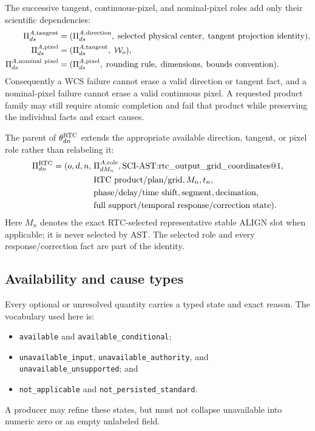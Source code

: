 The successive tangent, continuous-pixel, and nominal-pixel roles add only
their scientific dependencies:
\begin{align}
 \Pi^{A,{\rm tangent}}_{ds}
   &= (\Pi^{A,{\rm direction}}_{ds},\;
       \text{selected physical center},\;
       \text{tangent projection identity}),
       \label{eq:tangent-parent}\\
 \Pi^{A,{\rm pixel}}_{ds}
   &= (\Pi^{A,{\rm tangent}}_{ds},\;\mathcal W_o),
       \label{eq:pixel-parent}\\
 \Pi^{A,{\rm nominal\ pixel}}_{ds}
   &= (\Pi^{A,{\rm pixel}}_{ds},\;\text{rounding rule},\;
       \text{dimensions},\;\text{bounds convention}).
       \label{eq:nominal-pixel-parent}
\end{align}
Consequently a WCS failure cannot erase a valid direction or tangent fact,
and a nominal-pixel failure cannot erase a valid continuous pixel.  A
requested product family may still require atomic completion and fail that
product while preserving the individual facts and exact causes.

The parent of $\theta^{\rm RTC}_{dn}$ extends the appropriate available
direction, tangent, or pixel role rather than relabeling it:
\begin{equation}
 \begin{aligned}
 \Pi^{\rm RTC}_{dn} = (o,d,n,\;&\Pi^{A,{\rm role}}_{dM_n},
   \text{SCI-AST:rtc\_output\_grid\_coordinates@1},\\
   &\text{RTC product/plan/grid},M_n,t_n,\\
   &\text{phase/delay/time shift},\text{segment},\text{decimation},\\
   &\text{full support/temporal response/correction state}).
 \end{aligned}
 \label{eq:rtc-parent}
\end{equation}
Here $M_n$ denotes the exact RTC-selected representative stable ALIGN slot
when applicable; it is never selected by AST.  The selected role and every
response/correction fact are part of the identity.

\subsection{Availability and cause types}

Every optional or unresolved quantity carries a typed state and exact reason.
The vocabulary used here is:
\begin{itemize}
  \item \texttt{available} and \texttt{available\_conditional};
  \item \texttt{unavailable\_input}, \texttt{unavailable\_authority}, and
        \texttt{unavailable\_unsupported}; and
  \item \texttt{not\_applicable} and \texttt{not\_persisted\_standard}.
\end{itemize}
A producer may refine these states, but must not collapse unavailable into
numeric zero or an empty unlabeled field.

